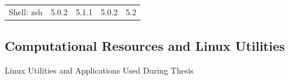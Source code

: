 \begin{table}[!ht]
{{\begin{tabular}{r|l|l|l|l|}
\multicolumn{1}{r|}{\cellcolor{white}Shell: zsh}             & 5.0.2                                                               & 5.1.1                                                             & 5.0.2                                                                  & 5.2                                                         \\ \cline{2-5}
\end{tabular}
}}
\end{table}

\subsection{Computational Resources and Linux Utilities}

\begin{table}[!ht]
\centering
\caption{Linux Utilities and Applications Used During Thesis}
\label{tab:computers_linux}


\end{table}
